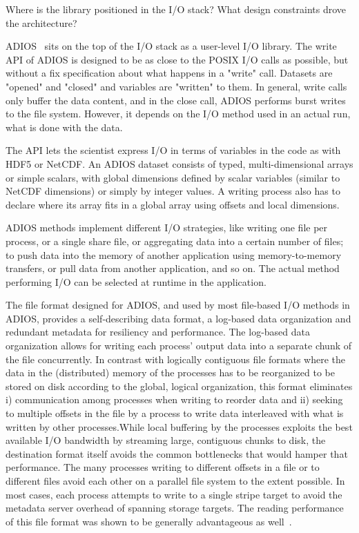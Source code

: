 {\color {red}Where is the library positioned in the I/O stack? What design constraints drove the architecture?}

ADIOS~\cite{ADIOS:Lofstead:ipdps09} sits on the top of the I/O stack as a user-level I/O library.
The write API of ADIOS is designed to be as close to the POSIX I/O calls as possible, but without a
fix specification about what happens in a "write" call. Datasets are "opened" and "closed" and
variables are "written" to them. In general, write calls only buffer the data content, and in the
close call, ADIOS performs burst writes to the file system. However, it depends on the I/O method
used in an actual run, what is done with the data.

The API lets the scientist express I/O in terms of variables in the code as with HDF5 or NetCDF. An
ADIOS dataset consists of typed, multi-dimensional arrays or simple scalars, with global dimensions
defined by scalar variables (similar to NetCDF dimensions) or simply by integer values. A writing
process also has to declare where its array fits in a global array using offsets and local
dimensions.

ADIOS methods implement different I/O strategies, like writing one file per process, or a single
share file, or aggregating data into a certain number of files; to push data into the memory of
another application using memory-to-memory transfers, or pull data from another application, and so
on. The actual method performing I/O can be selected at runtime in the application.

The file format designed for ADIOS, and used by most file-based I/O methods in ADIOS, provides a
self-describing data format, a log-based data organization and redundant metadata for resiliency and
performance. The log-based data organization allows for writing each process' output data into a
separate chunk of the file concurrently. In contrast with logically contiguous file formats where
the data in the (distributed) memory of the processes has to be reorganized to be stored on disk
according to the global, logical organization, this format eliminates i) communication among
processes when writing to reorder data and ii) seeking to multiple offsets in the file by a process
to write data interleaved with what is written by other processes.While local buffering by the
processes exploits the best available I/O bandwidth by streaming large, contiguous chunks to disk,
the destination format itself avoids the common bottlenecks that would hamper that performance. The
many processes writing to different offsets in a file or to different files avoid each other on a
parallel file system to the extent possible. In most cases, each process attempts to write to a
single stripe target to avoid the metadata server overhead of spanning storage targets. The reading
performance of this file format was shown to be generally advantageous as
well~\cite{ADIOS:Lofstead:hpdc11}.




